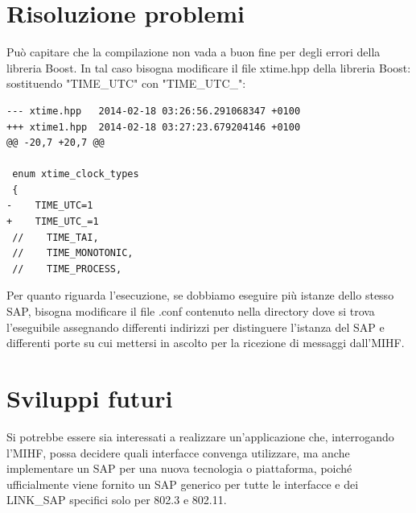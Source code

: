 \section{Risoluzione problemi}
Può capitare che la compilazione non vada a buon fine per degli errori della libreria Boost. In tal caso bisogna modificare il file xtime.hpp della libreria Boost:\\
sostituendo "TIME\_UTC" con "TIME\_UTC\_":\\
\begin{verbatim}
--- xtime.hpp   2014-02-18 03:26:56.291068347 +0100
+++ xtime1.hpp  2014-02-18 03:27:23.679204146 +0100
@@ -20,7 +20,7 @@

 enum xtime_clock_types
 {
-    TIME_UTC=1
+    TIME_UTC_=1
 //    TIME_TAI,
 //    TIME_MONOTONIC,
 //    TIME_PROCESS,
\end{verbatim}

Per quanto riguarda l'esecuzione, se dobbiamo eseguire più istanze dello stesso SAP, bisogna modificare il file .conf contenuto nella directory dove si trova l'eseguibile assegnando differenti indirizzi per distinguere l'istanza del SAP e differenti porte su cui mettersi in ascolto per la ricezione di messaggi dall'MIHF.

\section{Sviluppi futuri}
Si potrebbe essere sia interessati a realizzare un'applicazione che, interrogando l'MIHF, possa decidere quali interfacce convenga utilizzare, ma anche implementare un SAP per una nuova tecnologia o piattaforma, poiché ufficialmente viene fornito un SAP generico per tutte le interfacce e dei LINK\_SAP specifici solo per 802.3 e 802.11.